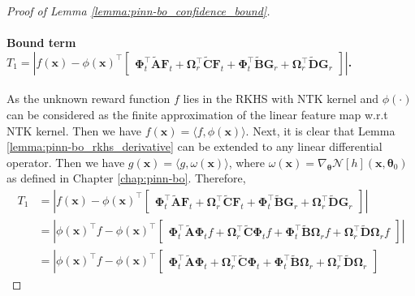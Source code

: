 \begin{proof}[Proof of Lemma \ref{lemma:pinn-bo_confidence_bound}]
    \paragraph{Bound term $T_1 = \left\lvert f(\mathbf{x}) - \phi(\mathbf{x})^\top \begin{bmatrix}
            \boldsymbol{\Phi}_t^\top \widetilde{\mathbf{A}}\mathbf{F}_t + \boldsymbol{\Omega}_r^\top \widetilde{\mathbf{C}}\mathbf{F}_t + \boldsymbol{\Phi}_t^\top \widetilde{\mathbf{B}}\mathbf{G}_r + \boldsymbol{\Omega}_r^\top \widetilde{\mathbf{D}}\mathbf{G}_r
        \end{bmatrix} \right\rvert$.\\}
    
    As the unknown reward function $f$ lies in the RKHS with NTK kernel and $\phi(\cdot)$ can be considered as the finite approximation of the linear feature map w.r.t NTK kernel. Then we have $f(\mathbf{x}) = \langle f, \phi(\mathbf{x}) \rangle$. Next, it is clear that Lemma \ref{lemma:pinn-bo_rkhs_derivative} can be extended to any linear differential operator. Then we have $g(\mathbf{x}) = \langle g, \omega(\mathbf{x}) \rangle$, where $\omega(\mathbf{x}) = \nabla_{\boldsymbol{\theta}}\mathcal{N}[h] (\mathbf{x}, \boldsymbol{\theta}_0)$ as defined in Chapter \ref{chap:pinn-bo}. Therefore, 
    \begin{align*}
            T_1 &= \left\lvert f(\mathbf{x}) - \phi(\mathbf{x})^\top \begin{bmatrix}
            \boldsymbol{\Phi}_t^\top \widetilde{\mathbf{A}}\mathbf{F}_t + \boldsymbol{\Omega}_r^\top \widetilde{\mathbf{C}}\mathbf{F}_t + \boldsymbol{\Phi}_t^\top \widetilde{\mathbf{B}}\mathbf{G}_r + \boldsymbol{\Omega}_r^\top \widetilde{\mathbf{D}}\mathbf{G}_r
        \end{bmatrix} \right\rvert \\
                &=  \left\lvert \phi(\mathbf{x})^\top f - \phi(\mathbf{x})^\top \begin{bmatrix}
            \boldsymbol{\Phi}_t^\top \widetilde{\mathbf{A}}\boldsymbol{\Phi}_tf + \boldsymbol{\Omega}_r^\top \widetilde{\mathbf{C}}\boldsymbol{\Phi}_tf + \boldsymbol{\Phi}_t^\top \widetilde{\mathbf{B}}\boldsymbol{\Omega}_rf + \boldsymbol{\Omega}_r^\top \widetilde{\mathbf{D}}\boldsymbol{\Omega}_rf
        \end{bmatrix} \right\rvert \\
                &= \left\lvert \phi(\mathbf{x})^\top f - \phi(\mathbf{x})^\top \begin{bmatrix}
            \boldsymbol{\Phi}_t^\top \widetilde{\mathbf{A}}\boldsymbol{\Phi}_t + \boldsymbol{\Omega}_r^\top \widetilde{\mathbf{C}}\boldsymbol{\Phi}_t + \boldsymbol{\Phi}_t^\top \widetilde{\mathbf{B}}\boldsymbol{\Omega}_r + \boldsymbol{\Omega}_r^\top \widetilde{\mathbf{D}}\boldsymbol{\Omega}_r

\end{bmatrix}
\end{align*}
\end{proof}
